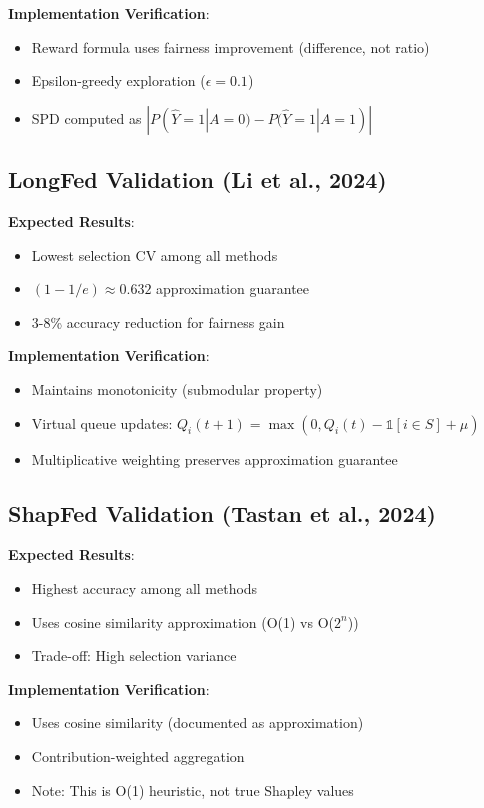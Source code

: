\documentclass{article}
\begin{document}
\textbf{Implementation Verification}:
\begin{itemize}
    \item[$\checkmark$] Reward formula uses fairness improvement (difference, not ratio)
    \item[$\checkmark$] Epsilon-greedy exploration ($\epsilon = 0.1$)
    \item[$\checkmark$] SPD computed as $|P(\hat{Y}=1|A=0) - P(\hat{Y}=1|A=1)|$
\end{itemize}

\subsection{LongFed Validation (Li et al., 2024)}

\textbf{Expected Results}:
\begin{itemize}
    \item Lowest selection CV among all methods
    \item $(1-1/e) \approx 0.632$ approximation guarantee
    \item 3-8\% accuracy reduction for fairness gain
\end{itemize}

\textbf{Implementation Verification}:
\begin{itemize}
    \item[$\checkmark$] Maintains monotonicity (submodular property)
    \item[$\checkmark$] Virtual queue updates: $Q_i(t+1) = \max(0, Q_i(t) - \mathbb{1}[i \in S] + \mu)$
    \item[$\checkmark$] Multiplicative weighting preserves approximation guarantee
\end{itemize}

\subsection{ShapFed Validation (Tastan et al., 2024)}

\textbf{Expected Results}:
\begin{itemize}
    \item Highest accuracy among all methods
    \item Uses cosine similarity approximation (O(1) vs O($2^n$))
    \item Trade-off: High selection variance
\end{itemize}

\textbf{Implementation Verification}:
\begin{itemize}
    \item[$\checkmark$] Uses cosine similarity (documented as approximation)
    \item[$\checkmark$] Contribution-weighted aggregation
    \item[$\triangle$] Note: This is O(1) heuristic, not true Shapley values
\end{itemize}
\end{document}
